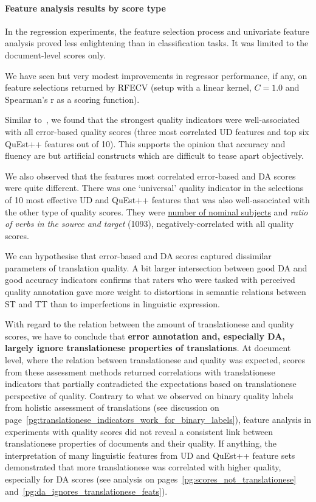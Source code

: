 \paragraph{Feature analysis results by score type}
In the regression experiments, the feature selection process and univariate feature analysis proved less enlightening than in classification tasks. It was limited to the document-level scores only.

We have seen but very modest improvements in regressor performance, if any, on feature selections returned by \gls{RFECV} (setup with a linear kernel, $C=1.0$ and Spearman's r as a scoring function).  

Similar to~\cite{Yuan2018}, we found that the strongest quality indicators were well-associated with all error-based quality scores (three most correlated UD features and top six QuEst++ features out of 10). 
This supports the opinion that accuracy and fluency are but artificial constructs which are difficult to tease apart objectively. %

We also observed that the features most correlated error-based and DA scores were quite different. There was one `universal' quality indicator in the selections of 10 most effective UD and QuEst++ features that was also well-associated with the other type of quality scores. They were \hyperlink{ft:nsubj}{number of nominal subjects} and \textit{ratio of verbs in the source and target} (1093), negatively-correlated with all quality scores.

We can hypothesise that error-based and DA scores captured dissimilar parameters of translation quality. A bit larger intersection between good DA and good accuracy indicators confirms that raters who were tasked with perceived quality annotation gave more weight to distortions in semantic relations between ST and TT than to imperfections in linguistic expression.

With regard to the relation between the amount of translationese and quality scores, we have to conclude that \textbf{error annotation and, especially DA, largely ignore translationese properties of translations}. 
At document level, where the relation between translationese and quality was expected, scores from these assessment methods returned correlations with translationese indicators that partially contradicted the expectations based on translationese perspective of quality. 
Contrary to what we observed on binary quality labels from holistic assessment of translations (see discussion on page~\ref{pg:translationese_indicators_work_for_binary_labels}), feature analysis in experiments with quality scores did not reveal a consistent link between translationese properties of documents and their quality. 
If anything, the interpretation of many linguistic features from UD and QuEst++ feature sets demonstrated that more translationese was correlated with higher quality, especially for DA scores (see analysis on pages~\ref{pg:scores_not_translationese} and~\ref{pg:da_ignores_translationese_feats}).
